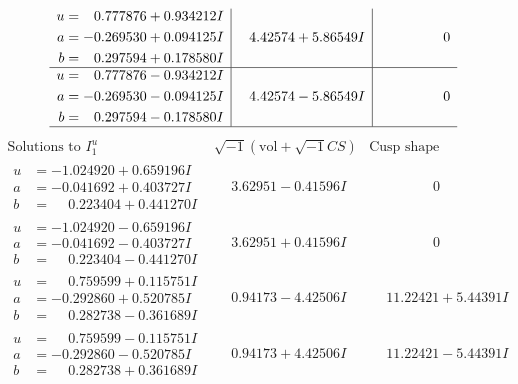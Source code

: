 \documentclass[1p]{elsarticle_modified}
\theoremstyle{definition}
\newcommand{\I}{\sqrt{-1}}
\begin{document}
$$\begin{array}{c|c|c}
\begin{aligned}
u &= \phantom{-}0.777876 + 0.934212 I \\
a &= -0.269530 + 0.094125 I \\
b &= \phantom{-}0.297594 + 0.178580 I\end{aligned}
 & \phantom{-}4.42574 + 5.86549 I & \phantom{-0.000000 } 0 \\ \hline\begin{aligned}
u &= \phantom{-}0.777876 - 0.934212 I \\
a &= -0.269530 - 0.094125 I \\
b &= \phantom{-}0.297594 - 0.178580 I\end{aligned}
 & \phantom{-}4.42574 - 5.86549 I & \phantom{-0.000000 } 0\\
 \hline 
 \end{array}$$\newpage$$\begin{array}{c|c|c}  
\text{Solutions to }I^u_{1}& \I (\text{vol} + \sqrt{-1}CS) & \text{Cusp shape}\\
 \hline 
\begin{aligned}
u &= -1.024920 + 0.659196 I \\
a &= -0.041692 + 0.403727 I \\
b &= \phantom{-}0.223404 + 0.441270 I\end{aligned}
 & \phantom{-}3.62951 - 0.41596 I & \phantom{-0.000000 } 0 \\ \hline\begin{aligned}
u &= -1.024920 - 0.659196 I \\
a &= -0.041692 - 0.403727 I \\
b &= \phantom{-}0.223404 - 0.441270 I\end{aligned}
 & \phantom{-}3.62951 + 0.41596 I & \phantom{-0.000000 } 0 \\ \hline\begin{aligned}
u &= \phantom{-}0.759599 + 0.115751 I \\
a &= -0.292860 + 0.520785 I \\
b &= \phantom{-}0.282738 - 0.361689 I\end{aligned}
 & \phantom{-}0.94173 - 4.42506 I & \phantom{-}11.22421 + 5.44391 I \\ \hline\begin{aligned}
u &= \phantom{-}0.759599 - 0.115751 I \\
a &= -0.292860 - 0.520785 I \\
b &= \phantom{-}0.282738 + 0.361689 I\end{aligned}
 & \phantom{-}0.94173 + 4.42506 I & \phantom{-}11.22421 - 5.44391 I \\ \hline\begin{aligned}

\end{aligned}
\end{array}$$
\end{document}
